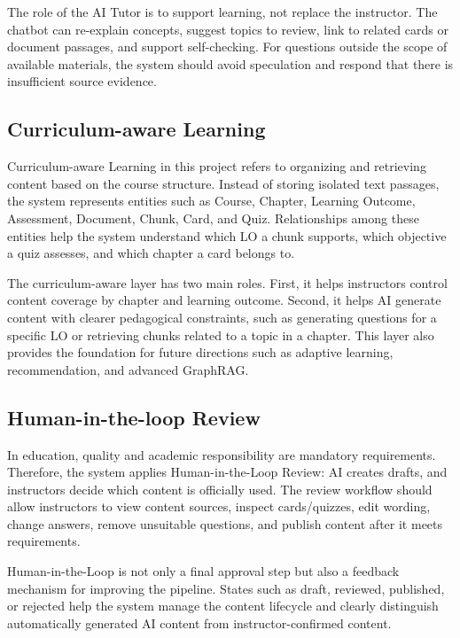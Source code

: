 The role of the AI Tutor is to support learning, not replace the instructor.
The chatbot can re-explain concepts, suggest topics to review, link to related
cards or document passages, and support self-checking. For questions outside
the scope of available materials, the system should avoid speculation and
respond that there is insufficient source evidence.

\subsection{Curriculum-aware Learning}

Curriculum-aware Learning in this project refers to organizing and retrieving
content based on the course structure. Instead of storing isolated text
passages, the system represents entities such as Course, Chapter, Learning
Outcome, Assessment, Document, Chunk, Card, and Quiz. Relationships among these
entities help the system understand which LO a chunk supports, which objective
a quiz assesses, and which chapter a card belongs to.

The curriculum-aware layer has two main roles. First, it helps instructors
control content coverage by chapter and learning outcome. Second, it helps AI
generate content with clearer pedagogical constraints, such as generating
questions for a specific LO or retrieving chunks related to a topic in a
chapter. This layer also provides the foundation for future directions such as
adaptive learning, recommendation, and advanced GraphRAG.

\subsection{Human-in-the-loop Review}

In education, quality and academic responsibility are mandatory requirements.
Therefore, the system applies Human-in-the-Loop Review: AI creates drafts, and
instructors decide which content is officially used. The review workflow should
allow instructors to view content sources, inspect cards/quizzes, edit wording,
change answers, remove unsuitable questions, and publish content after it
meets requirements.

Human-in-the-Loop is not only a final approval step but also a feedback
mechanism for improving the pipeline. States such as draft, reviewed,
published, or rejected help the system manage the content lifecycle and clearly
distinguish automatically generated AI content from instructor-confirmed
content.

